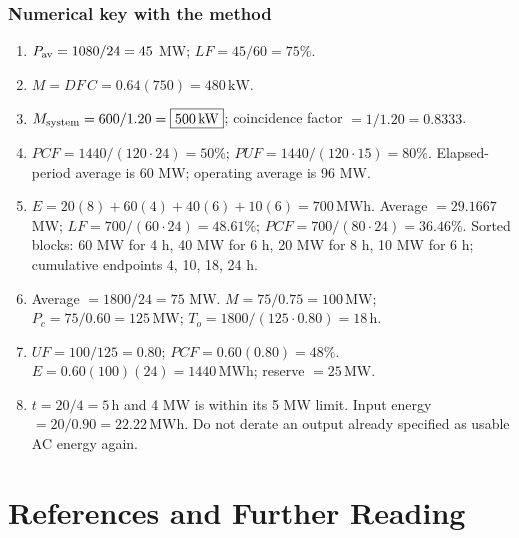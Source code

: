 \documentclass[11pt,a4paper]{article}
\newcommand{\chapterstart}[2]{\clearpage\section{#1}\label{#2}}
\begin{document}
\subsubsection{Numerical key with the method}
\begin{enumerate}[label=\textbf{N\arabic*.}]
\item $P_{\rm av}=1080/24=45$ MW; $LF=45/60=\boxed{75\%}$.
\item $M=DF\,C=0.64(750)=\boxed{480\,\mathrm{kW}}$.
\item $M_{\rm system}=600/1.20=\boxed{500\,\mathrm{kW}}$; coincidence factor $=1/1.20=\boxed{0.8333}$.
\item $PCF=1440/(120\cdot24)=\boxed{50\%}$; $PUF=1440/(120\cdot15)=\boxed{80\%}$. Elapsed-period average is 60 MW; operating average is 96 MW.
\item $E=20(8)+60(4)+40(6)+10(6)=\boxed{700\,\mathrm{MWh}}$. Average $=29.1667$ MW; $LF=700/(60\cdot24)=\boxed{48.61\%}$; $PCF=700/(80\cdot24)=\boxed{36.46\%}$. Sorted blocks: 60 MW for 4 h, 40 MW for 6 h, 20 MW for 8 h, 10 MW for 6 h; cumulative endpoints 4, 10, 18, 24 h.
\item Average $=1800/24=75$ MW. $M=75/0.75=\boxed{100\,\mathrm{MW}}$; $P_c=75/0.60=\boxed{125\,\mathrm{MW}}$; $T_o=1800/(125\cdot0.80)=\boxed{18\,\mathrm{h}}$.
\item $UF=100/125=0.80$; $PCF=0.60(0.80)=\boxed{48\%}$. $E=0.60(100)(24)=\boxed{1440\,\mathrm{MWh}}$; reserve $=\boxed{25\,\mathrm{MW}}$.
\item $t=20/4=\boxed{5\,\mathrm{h}}$ and 4 MW is within its 5 MW limit. Input energy $=20/0.90=\boxed{22.22\,\mathrm{MWh}}$. Do not derate an output already specified as usable AC energy again.
\end{enumerate}

\chapterstart{References and Further Reading}{sources}
\end{document}
